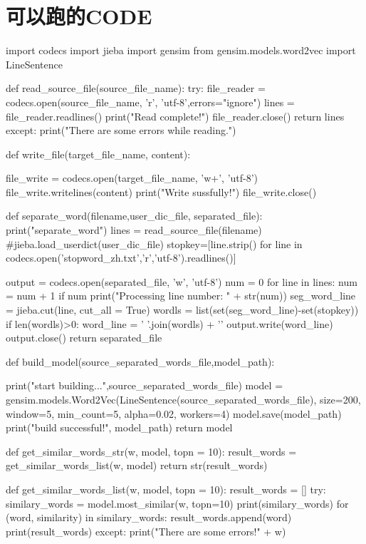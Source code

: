 \section{可以跑的CODE}
\begin{python}
import codecs
import jieba
import gensim
from gensim.models.word2vec import LineSentence

def read_source_file(source_file_name):
    try:
        file_reader = codecs.open(source_file_name, 'r', 'utf-8',errors="ignore")
        lines = file_reader.readlines()
        print("Read complete!")
        file_reader.close()
        return lines
    except:
        print("There are some errors while reading.")

def write_file(target_file_name, content):
    
    file_write = codecs.open(target_file_name, 'w+', 'utf-8')
    file_write.writelines(content)
    print("Write sussfully!")
    file_write.close()

def separate_word(filename,user_dic_file, separated_file):
    print("separate_word")
    lines = read_source_file(filename)
    #jieba.load_userdict(user_dic_file)
    stopkey=[line.strip() for line in codecs.open('stopword_zh.txt','r','utf-8').readlines()]

    output = codecs.open(separated_file, 'w', 'utf-8')
    num = 0
    for line in lines:
        num = num + 1
        if num%
            print("Processing line number: " + str(num))
        seg_word_line = jieba.cut(line, cut_all = True)
        wordls = list(set(seg_word_line)-set(stopkey))
        if len(wordls)>0:
            word_line = ' '.join(wordls) + '\n'
        output.write(word_line)
    output.close()
    return separated_file
   

def build_model(source_separated_words_file,model_path):

    print("start building...",source_separated_words_file)
    model = gensim.models.Word2Vec(LineSentence(source_separated_words_file), size=200, window=5, min_count=5, alpha=0.02, workers=4)       
    model.save(model_path)
    print("build successful!", model_path)
    return model

def get_similar_words_str(w, model, topn = 10):
    result_words = get_similar_words_list(w, model)    
    return str(result_words)


def get_similar_words_list(w, model, topn = 10):
    result_words = []
    try:
        similary_words = model.most_similar(w, topn=10)
        print(similary_words)
        for (word, similarity) in similary_words:
            result_words.append(word)
        print(result_words)
    except:
        print("There are some errors!" + w)
        

\end{python}
